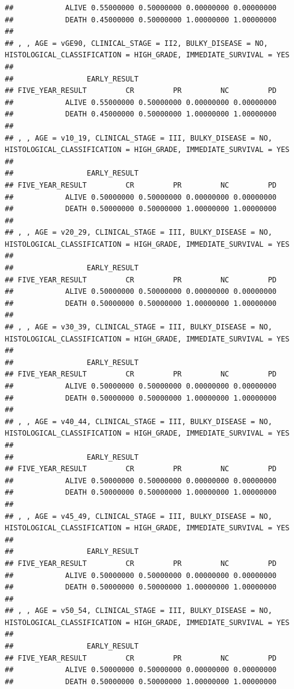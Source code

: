 \documentclass[]{article}
\begin{document}
\begin{verbatim}
##            ALIVE 0.55000000 0.50000000 0.00000000 0.00000000
##            DEATH 0.45000000 0.50000000 1.00000000 1.00000000
## 
## , , AGE = vGE90, CLINICAL_STAGE = II2, BULKY_DISEASE = NO, HISTOLOGICAL_CLASSIFICATION = HIGH_GRADE, IMMEDIATE_SURVIVAL = YES
## 
##                 EARLY_RESULT
## FIVE_YEAR_RESULT         CR         PR         NC         PD
##            ALIVE 0.55000000 0.50000000 0.00000000 0.00000000
##            DEATH 0.45000000 0.50000000 1.00000000 1.00000000
## 
## , , AGE = v10_19, CLINICAL_STAGE = III, BULKY_DISEASE = NO, HISTOLOGICAL_CLASSIFICATION = HIGH_GRADE, IMMEDIATE_SURVIVAL = YES
## 
##                 EARLY_RESULT
## FIVE_YEAR_RESULT         CR         PR         NC         PD
##            ALIVE 0.50000000 0.50000000 0.00000000 0.00000000
##            DEATH 0.50000000 0.50000000 1.00000000 1.00000000
## 
## , , AGE = v20_29, CLINICAL_STAGE = III, BULKY_DISEASE = NO, HISTOLOGICAL_CLASSIFICATION = HIGH_GRADE, IMMEDIATE_SURVIVAL = YES
## 
##                 EARLY_RESULT
## FIVE_YEAR_RESULT         CR         PR         NC         PD
##            ALIVE 0.50000000 0.50000000 0.00000000 0.00000000
##            DEATH 0.50000000 0.50000000 1.00000000 1.00000000
## 
## , , AGE = v30_39, CLINICAL_STAGE = III, BULKY_DISEASE = NO, HISTOLOGICAL_CLASSIFICATION = HIGH_GRADE, IMMEDIATE_SURVIVAL = YES
## 
##                 EARLY_RESULT
## FIVE_YEAR_RESULT         CR         PR         NC         PD
##            ALIVE 0.50000000 0.50000000 0.00000000 0.00000000
##            DEATH 0.50000000 0.50000000 1.00000000 1.00000000
## 
## , , AGE = v40_44, CLINICAL_STAGE = III, BULKY_DISEASE = NO, HISTOLOGICAL_CLASSIFICATION = HIGH_GRADE, IMMEDIATE_SURVIVAL = YES
## 
##                 EARLY_RESULT
## FIVE_YEAR_RESULT         CR         PR         NC         PD
##            ALIVE 0.50000000 0.50000000 0.00000000 0.00000000
##            DEATH 0.50000000 0.50000000 1.00000000 1.00000000
## 
## , , AGE = v45_49, CLINICAL_STAGE = III, BULKY_DISEASE = NO, HISTOLOGICAL_CLASSIFICATION = HIGH_GRADE, IMMEDIATE_SURVIVAL = YES
## 
##                 EARLY_RESULT
## FIVE_YEAR_RESULT         CR         PR         NC         PD
##            ALIVE 0.50000000 0.50000000 0.00000000 0.00000000
##            DEATH 0.50000000 0.50000000 1.00000000 1.00000000
## 
## , , AGE = v50_54, CLINICAL_STAGE = III, BULKY_DISEASE = NO, HISTOLOGICAL_CLASSIFICATION = HIGH_GRADE, IMMEDIATE_SURVIVAL = YES
## 
##                 EARLY_RESULT
## FIVE_YEAR_RESULT         CR         PR         NC         PD
##            ALIVE 0.50000000 0.50000000 0.00000000 0.00000000
##            DEATH 0.50000000 0.50000000 1.00000000 1.00000000

\end{verbatim}
\end{document}
